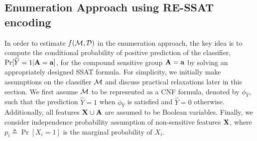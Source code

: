 \subsection{Enumeration Approach  using RE-SSAT encoding}
\label{fairness_justicia_sec:enumeration_ssat}
In order to estimate $ f(\mathcal{M}, \mathcal{D}) $ in the enumeration approach, the key idea  is to compute the conditional probability of positive prediction of the classifier, $\Pr[\widehat{Y} = 1 | \mathbf{A} = \mathbf{a}]$, for the compound sensitive group $\mathbf{A} = \mathbf{a}$ by solving an appropriately designed SSAT formula.  For simplicity, we  initially make assumptions on the classifier $ \mathcal{M} $ and discuss practical relaxations later in this section.  We first assume $\mathcal{M}$ to be represented as a CNF formula, denoted by $\phi_{\widehat{Y}}$, such that the prediction $ \widehat{Y} = 1 $ when $ \phi_{\widehat{Y}}$ is satisfied and  $\widehat{Y} =0$ otherwise. Additionally, all features $ \mathbf{X} \cup \mathbf{A} $ are assumed to be Boolean variables.  Finally, we consider independence probability assumption of non-sensitive features $ \mathbf{X} $, where $p_i \triangleq \Pr[X_i = 1] $ is the marginal probability of $ X_i $. 



